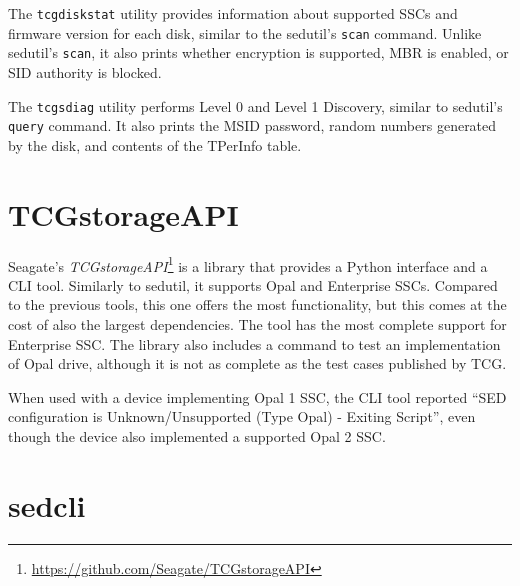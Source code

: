 The \verb|tcgdiskstat| utility provides information about supported SSCs and firmware version for each disk, similar to the sedutil's \verb|scan| command. Unlike sedutil's \verb|scan|, it also prints whether encryption is supported, MBR is enabled, or SID authority is blocked.

The \verb|tcgsdiag| utility performs Level 0 and Level 1 Discovery, similar to sedutil's \verb|query| command. It also prints the MSID password, random numbers generated by the disk, and contents of the TPerInfo table. 



\section{TCGstorageAPI}

Seagate's \emph{TCGstorageAPI}\footnote{\url{https://github.com/Seagate/TCGstorageAPI}} is a library that provides a Python interface and a CLI tool. Similarly to sedutil, it supports Opal and Enterprise SSCs.
Compared to the previous tools, this one offers the most functionality, but this comes at the cost of also the largest dependencies. The tool has the most complete support for Enterprise SSC.
The library also includes a command to test an implementation of Opal drive, although it is not as complete as the test cases published by TCG.

When used with a device implementing Opal 1 SSC, the CLI tool reported ``SED configuration is Unknown/Unsupported (Type Opal) - Exiting Script'', even though the device also implemented a supported Opal 2 SSC.







\section{sedcli}

